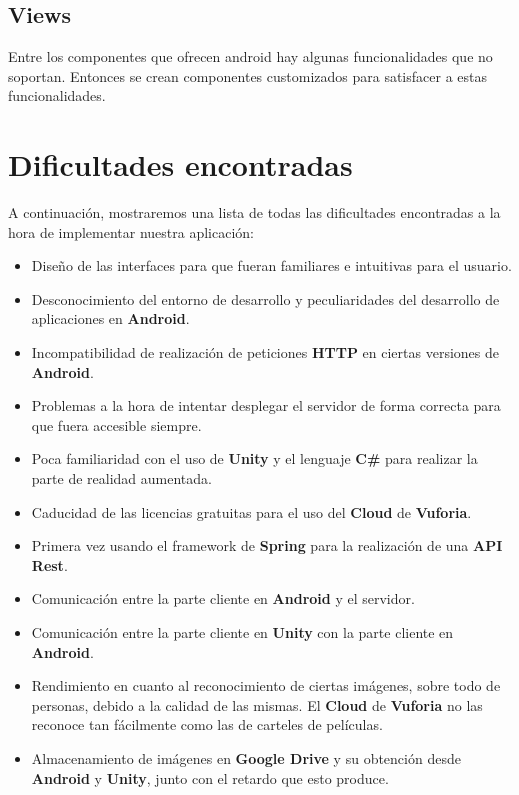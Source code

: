 \subsection{Views}
\label{makereference4.3.7}
Entre los componentes que ofrecen android hay algunas funcionalidades que no soportan. Entonces se crean componentes customizados para satisfacer a estas funcionalidades.

\section{Dificultades encontradas}
\label{makereference4.4}
A continuación, mostraremos una lista de todas las dificultades encontradas a la hora de implementar nuestra aplicación:
\begin{itemize}
    \item Diseño de las interfaces para que fueran familiares e intuitivas para el usuario.
    \item Desconocimiento del entorno de desarrollo y peculiaridades del desarrollo de aplicaciones en \textbf{Android}.
    \item Incompatibilidad de realización de peticiones \textbf{HTTP} en ciertas versiones de \textbf{Android}.
    \item Problemas a la hora de intentar desplegar el servidor de forma correcta para que fuera accesible siempre.
    \item Poca familiaridad con el uso de \textbf{Unity} y el lenguaje \textbf{C\#} para realizar la parte de realidad aumentada.
    \item Caducidad de las licencias gratuitas para el uso del \textbf{Cloud} de \textbf{Vuforia}.
    \item Primera vez usando el framework de \textbf{Spring} para la realización de una \textbf{API Rest}.
    \item Comunicación entre la parte cliente en \textbf{Android} y el servidor.
    \item Comunicación entre la parte cliente en \textbf{Unity} con la parte cliente en \textbf{Android}.
    \item Rendimiento en cuanto al reconocimiento de ciertas imágenes, sobre todo de personas, debido a la calidad de las mismas. El \textbf{Cloud} de \textbf{Vuforia} no las reconoce tan fácilmente como las de carteles de películas.
    \item Almacenamiento de imágenes en \textbf{Google Drive} y su obtención desde \textbf{Android} y \textbf{Unity}, junto con el retardo que esto produce.
\end{itemize}
